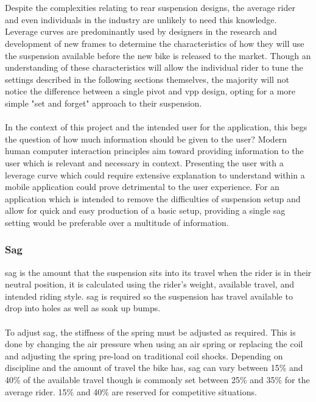 		\\\\
		Despite the complexities relating to rear suspension designs, the average rider and even individuals in the industry are unlikely to need this knowledge. Leverage curves are predominantly used by designers in the research and development of new frames to determine the characteristics of how they will use the suspension available before the new bike is released to the market. Though an understanding of these characteristics will allow the individual rider to tune the settings described in the following sections themselves, the majority will not notice the difference between a single pivot and \gls{vpp} design, opting for a more simple "set and forget" approach to their suspension.
		\\\\
		In the context of this project and the intended user for the application, this begs the question of how much information should be given to the user? Modern human computer interaction principles aim toward providing information to the user which is relevant and necessary in context. Presenting the user with a leverage curve which could require extensive explanation to understand within a mobile application could prove detrimental to the user experience. For an application which is intended to remove the difficulties of suspension setup and allow for quick and easy production of a basic setup, providing a single sag setting would be preferable over a multitude of information. 
	\subsubsection{Sag}
		\Gls{sag} is the amount that the suspension sits into its travel when the rider is in their neutral position, it is calculated using the rider's weight, available \gls{travel}, and intended riding style. \Gls{sag} is required so the suspension has travel available to drop into holes as well as soak up bumps. 
		\\\\
		To adjust \gls{sag}, the stiffness of the spring must be adjusted as required. This is done by changing the air pressure when using an air spring or replacing the coil and adjusting the spring pre-load on traditional coil \glspl{shock}. Depending on discipline and the amount of \gls{travel} the bike has, \gls{sag} can vary between 15\% and 40\% of the available travel though is commonly set between 25\% and 35\% for the average rider. 15\% and 40\% are reserved for competitive situations. 
